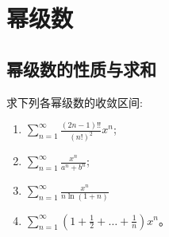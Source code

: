 \chapter{幂级数}

\section{幂级数的性质与求和}

\begin{problem}
    求下列各幂级数的收敛区间:
    \begin{enumerate}
        \item \(\sum_{n=1}^{\infty} \frac{(2n-1)!!}{(n!)^2} x^n\);
        \item \(\sum_{n=1}^{\infty} \frac{x^{n}}{a^{n} + b^{n}}\);
        \item \(\sum_{n=1}^{\infty} \frac{x^n}{n \ln(1+n)}\)
        \item \(\sum_{n=1}^{\infty} \left(1 + \frac{1}{2} + \dots +
            \frac{1}{n}\right) x^n\)。
    \end{enumerate}
\end{problem}

